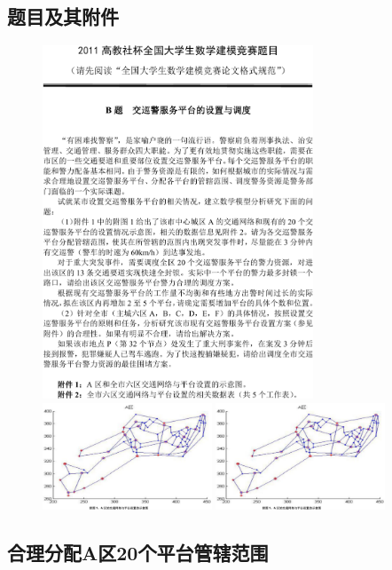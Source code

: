 \subsection{题目及其附件}
\begin{figure}[h]
\centering
\includegraphics[width=0.72\textwidth]{Figures/2011B_Question}
\includegraphics[width=0.45\textwidth,page=1]{Figures/2011B}
\includegraphics[width=0.45\textwidth,page=2]{Figures/2011B}
\end{figure}
\subsection{合理分配A区20个平台管辖范围}
